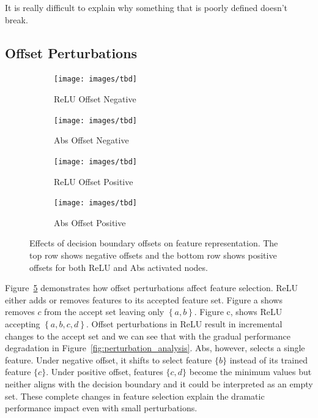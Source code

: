 It is really difficult to explain why something that is poorly defined doesn't break.

\subsection{Offset Perturbations}

\begin{figure}[t]
    \centering

    \begin{subfigure}[b]{0.49\textwidth}
        \centering
        \texttt{[image: images/tbd]}
        \caption{ReLU Offset Negative}
        \label{fig:relu_offset_down}
    \end{subfigure}
    \hfill
    \begin{subfigure}[b]{0.49\textwidth}
        \centering
        \texttt{[image: images/tbd]}
        \caption{Abs Offset Negative}
        \label{fig:abs_offset_down}
    \end{subfigure}

    \begin{subfigure}[b]{0.49\textwidth}
    \centering
    \texttt{[image: images/tbd]}
    \caption{ReLU Offset Positive}
    \label{fig:relu_offset_up}
    \end{subfigure}
    \hfill
    \begin{subfigure}[b]{0.49\textwidth}
    \centering
    \texttt{[image: images/tbd]}
    \caption{Abs Offset Positive}
    \label{fig:abs_offset_up}
    \end{subfigure}

    \caption{Effects of decision boundary offsets on feature representation. The top row shows negative offsets and the bottom row shows positive offsets for both ReLU and Abs activated nodes.}
    \label{fig:offset_demo}
\end{figure}

Figure~\ref{fig:offset_demo} demonstrates how offset perturbations affect feature selection. ReLU either adds or removes features to its accepted feature set. Figure a shows removes $c$ from the accept set leaving only $\left\{ a, b \right\}$. Figure c, shows ReLU accepting $\left\{ a, b, c, d \right\}$. Offset perturbations in ReLU result in incremental changes to the accept set and we can see that with the gradual performance degradation in Figure~\ref{fig:perturbation_analysis}. Abs, however, selects a single feature. Under negative offset, it shifts to select feature $\{b\}$ instead of its trained feature $\{c\}$. Under positive offset, features $\{c,d\}$ become the minimum values but neither aligns with the decision boundary and it could be interpreted as an empty set. These complete changes in feature selection explain the dramatic performance impact even with small perturbations.


